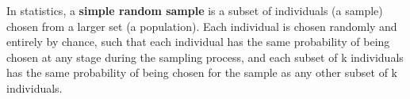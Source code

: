 In statistics, a \textbf{simple random sample} is a subset of individuals (a sample) chosen from a larger set (a population). Each individual is chosen randomly and entirely by chance, such that each individual has the same probability of being chosen at any stage during the sampling process, and each subset of k individuals has the same probability of being chosen for the sample as any other subset of k individuals.




